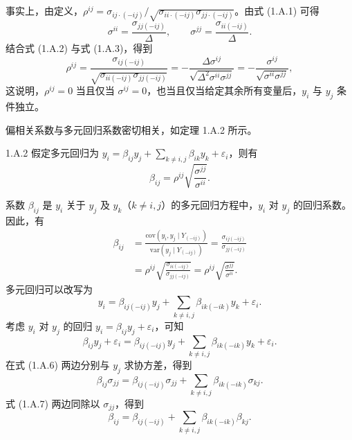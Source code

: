 \begin{bookproof}
事实上，由定义，$\rho^{ij}=\sigma_{ij\cdot(-ij)}/\sqrt{\sigma_{ii\cdot(-ij)}\sigma_{jj\cdot(-ij)}}$。由式 (1.A.1) 可得
\begin{equation}
\sigma^{ii}=\frac{\sigma_{jj(-ij)}}{\Delta},\qquad
\sigma^{jj}=\frac{\sigma_{ii(-ij)}}{\Delta}.
\tag{1.A.3}
\end{equation}
结合式 (1.A.2) 与式 (1.A.3)，得到
\begin{equation}
\rho^{ij}
=\frac{\sigma_{ij(-ij)}}{\sqrt{\sigma_{ii(-ij)}\sigma_{jj(-ij)}}}
=-\frac{\Delta\sigma^{ij}}{\sqrt{\Delta^2\sigma^{ii}\sigma^{jj}}}
=-\frac{\sigma^{ij}}{\sqrt{\sigma^{ii}\sigma^{jj}}},
\tag{1.A.4}
\end{equation}
这说明，$\rho^{ij}=0$ 当且仅当 $\sigma^{ij}=0$，也当且仅当给定其余所有变量后，$y_i$ 与 $y_j$ 条件独立。
\end{bookproof}

偏相关系数与多元回归系数密切相关，如定理 1.A.2 所示。

\begin{booktheorem}{1.A.2}
假定多元回归为 $y_i=\beta_{ij}y_j+\sum_{k\ne i,j}\beta_{ik}y_k+\varepsilon_i$，则有
\[
\beta_{ij}=\rho^{ij}\sqrt{\frac{\sigma^{jj}}{\sigma^{ii}}}.
\]
\end{booktheorem}

\begin{bookproof}
系数 $\beta_{ij}$ 是 $y_i$ 关于 $y_j$ 及 $y_k$（$k\ne i,j$）的多元回归方程中，$y_i$ 对 $y_j$ 的回归系数。因此，有
\[
\begin{aligned}
\beta_{ij}
&=\frac{\mathrm{cov}(y_i,y_j\mid Y_{(-ij)})}{\mathrm{var}(y_j\mid Y_{(-ij)})}
=\frac{\sigma_{ij(-ij)}}{\sigma_{jj(-ij)}} \\
&=\rho^{ij}\sqrt{\frac{\sigma_{ii(-ij)}}{\sigma_{jj(-ij)}}}
=\rho^{ij}\sqrt{\frac{\sigma^{jj}}{\sigma^{ii}}}.
\end{aligned}
\]
多元回归可以改写为
\begin{equation}
y_i=\beta_{ij(-ij)}y_j+\sum_{k\ne i,j}\beta_{ik(-ik)}y_k+\varepsilon_i.
\tag{1.A.5}
\end{equation}
考虑 $y_i$ 对 $y_j$ 的回归 $y_i=\beta_{ij}y_j+\varepsilon_i$，可知
\begin{equation}
\beta_{ij}y_j+\varepsilon_i
=\beta_{ij(-ij)}y_j+\sum_{k\ne i,j}\beta_{ik(-ik)}y_k+\varepsilon_i.
\tag{1.A.6}
\end{equation}
在式 (1.A.6) 两边分别与 $y_j$ 求协方差，得到
\begin{equation}
\beta_{ij}\sigma_{jj}
=\beta_{ij(-ij)}\sigma_{jj}+\sum_{k\ne i,j}\beta_{ik(-ik)}\sigma_{kj}.
\tag{1.A.7}
\end{equation}
式 (1.A.7) 两边同除以 $\sigma_{jj}$，得到
\begin{equation}
\beta_{ij}=\beta_{ij(-ij)}+\sum_{k\ne i,j}\beta_{ik(-ik)}\beta_{kj}.
\tag{1.A.8}
\end{equation}
\end{bookproof}

